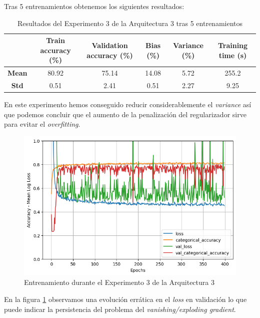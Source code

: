 \documentclass{article}
\begin{document}
			Tras 5 entrenamientos obtenemos los siguientes resultados:
			\begin{table}[!h]
				\begin{center}
					\begin{tabular}{ c | c | c | c | c | c |}
						\ & \textbf{Train accuracy (\%)} & \textbf{Validation accuracy (\%)} & \textbf{Bias (\%)} & \textbf{Variance (\%)} & \textbf{Training time (s)} \\ \hline
						\textbf{Mean} & 80.92 & 75.14 & 14.08 & 5.72 & 255.2 \\ \hline
						\textbf{Std} & 0.51 & 2.41 & 0.51 & 2.27 & 9.25 \\ \hline
					\end{tabular}
					\caption{Resultados del Experimento 3 de la Arquitectura 3 tras 5 entrenamientos}
					\label{tab:res-d-a3-e3}
				\end{center}
			\end{table}
			
			En este experimento hemos conseguido reducir considerablemente el \textit{variance} as\'i que podemos concluir que el aumento de la penalizaci\'on del regularizador sirve para evitar el \textit{overfitting}.
			\begin{figure}[!h]
				\begin{center}
					\includegraphics[scale=0.5]{d-tr-a3-e3.png}		
					\caption{Entrenamiento durante el Experimento 3 de la Arquitectura 3}	
					\label{d-tr-a3-e3}
				\end{center}
			\end{figure}
			En la figura \ref{d-tr-a3-e3} observamos una evoluci\'on err\'atica en el \textit{loss} en validaci\'on lo que puede indicar la persistencia del problema del \textit{vanishing/exploding gradient}.
			
\end{document}
